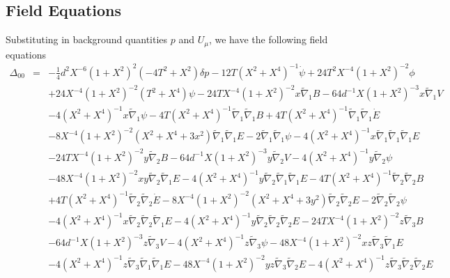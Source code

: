 \documentclass[10pt,letterpaper]{article}
\numberwithin{equation}{section}
\begin{document}
\newpage
\begin{appendices}
	\section{Field Equations}
	Substituting in background quantities $p$ and $U_\mu$, we have the following field equations
\begin{eqnarray}
\Delta_{00}&=& - \tfrac{1}{4} d^2 X^{-6} (1 + X^2)^2 (-4 T^2 + X^2) \delta p - 12 T (X^2 + X^4)^{-1} \dot{\psi} + 24 T^2 X^{-4} (1 + X^2)^{-2} \phi \nonumber \\ 
&& + 24 X^{-4} (1 + X^2)^{-2} (T^2 + X^4) \psi - 24 T X^{-4} (1 + X^2)^{-2} x \tilde{\nabla}_{1}B - 64 d^{-1} X (1 + X^2)^{-3} x \tilde{\nabla}_{1}V \nonumber \\ 
&& - 4 (X^2 + X^4)^{-1} x \tilde{\nabla}_{1}\psi - 4 T (X^2 + X^4)^{-1} \tilde{\nabla}_{1}\tilde{\nabla}_{1}B + 4 T (X^2 + X^4)^{-1} \tilde{\nabla}_{1}\tilde{\nabla}_{1}\dot{E} \nonumber \\ 
&& - 8 X^{-4} (1 + X^2)^{-2} (X^2 + X^4 + 3 x^2) \tilde{\nabla}_{1}\tilde{\nabla}_{1}E - 2 \tilde{\nabla}_{1}\tilde{\nabla}_{1}\psi - 4 (X^2 + X^4)^{-1} x \tilde{\nabla}_{1}\tilde{\nabla}_{1}\tilde{\nabla}_{1}E \nonumber \\ 
&& - 24 T X^{-4} (1 + X^2)^{-2} y \tilde{\nabla}_{2}B - 64 d^{-1} X (1 + X^2)^{-3} y \tilde{\nabla}_{2}V - 4 (X^2 + X^4)^{-1} y \tilde{\nabla}_{2}\psi \nonumber \\ 
&& - 48 X^{-4} (1 + X^2)^{-2} x y \tilde{\nabla}_{2}\tilde{\nabla}_{1}E - 4 (X^2 + X^4)^{-1} y \tilde{\nabla}_{2}\tilde{\nabla}_{1}\tilde{\nabla}_{1}E - 4 T (X^2 + X^4)^{-1} \tilde{\nabla}_{2}\tilde{\nabla}_{2}B \nonumber \\ 
&& + 4 T (X^2 + X^4)^{-1} \tilde{\nabla}_{2}\tilde{\nabla}_{2}\dot{E} - 8 X^{-4} (1 + X^2)^{-2} (X^2 + X^4 + 3 y^2) \tilde{\nabla}_{2}\tilde{\nabla}_{2}E - 2 \tilde{\nabla}_{2}\tilde{\nabla}_{2}\psi \nonumber \\ 
&& - 4 (X^2 + X^4)^{-1} x \tilde{\nabla}_{2}\tilde{\nabla}_{2}\tilde{\nabla}_{1}E - 4 (X^2 + X^4)^{-1} y \tilde{\nabla}_{2}\tilde{\nabla}_{2}\tilde{\nabla}_{2}E - 24 T X^{-4} (1 + X^2)^{-2} z \tilde{\nabla}_{3}B \nonumber \\ 
&& - 64 d^{-1} X (1 + X^2)^{-3} z \tilde{\nabla}_{3}V - 4 (X^2 + X^4)^{-1} z \tilde{\nabla}_{3}\psi - 48 X^{-4} (1 + X^2)^{-2} x z \tilde{\nabla}_{3}\tilde{\nabla}_{1}E \nonumber \\ 
&& - 4 (X^2 + X^4)^{-1} z \tilde{\nabla}_{3}\tilde{\nabla}_{1}\tilde{\nabla}_{1}E - 48 X^{-4} (1 + X^2)^{-2} y z \tilde{\nabla}_{3}\tilde{\nabla}_{2}E - 4 (X^2 + X^4)^{-1} z \tilde{\nabla}_{3}\tilde{\nabla}_{2}\tilde{\nabla}_{2}E \nonumber \\ 

\end{eqnarray}
\end{appendices}
\end{document}
